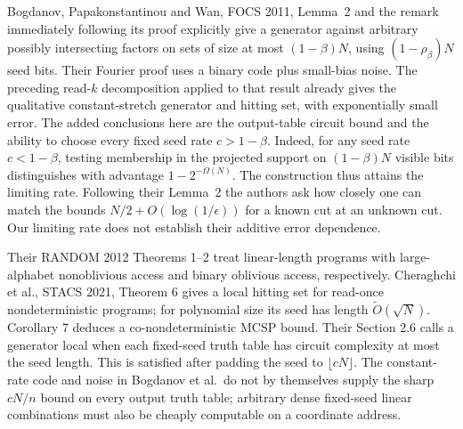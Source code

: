 Bogdanov, Papakonstantinou and Wan, FOCS 2011, Lemma~2 and the remark immediately following its proof explicitly give a generator against arbitrary possibly intersecting factors on sets of size at most $(1-\beta)N$, using $(1-\rho_\beta)N$ seed bits. Their Fourier proof uses a binary code plus small-bias noise. The preceding read-$k$ decomposition applied to that result already gives the qualitative constant-stretch generator and hitting set, with exponentially small error. The added conclusions here are the output-table circuit bound and the ability to choose every fixed seed rate $c>1-\beta$. Indeed, for any seed rate $c<1-\beta$, testing membership in the projected support on $(1-\beta)N$ visible bits distinguishes with advantage $1-2^{-\Omega(N)}$. The construction thus attains the limiting rate. Following their Lemma~2 the authors ask how closely one can match the bounds $N/2+O(\log(1/\epsilon))$ for a known cut at an unknown cut. Our limiting rate does not establish their additive error dependence.

Their RANDOM 2012 Theorems 1--2 treat linear-length programs with large-alphabet nonoblivious access and binary oblivious access, respectively. Cheraghchi et al., STACS 2021, Theorem 6 gives a local hitting set for read-once nondeterministic programs; for polynomial size its seed has length $\widetilde O(\sqrt N)$. Corollary 7 deduces a co-nondeterministic MCSP bound. Their Section 2.6 calls a generator local when each fixed-seed truth table has circuit complexity at most the seed length. This is satisfied after padding the seed to $\lfloor cN\rfloor$. The constant-rate code and noise in Bogdanov et al.\ do not by themselves supply the sharp $cN/n$ bound on every output truth table; arbitrary dense fixed-seed linear combinations must also be cheaply computable on a coordinate address.
